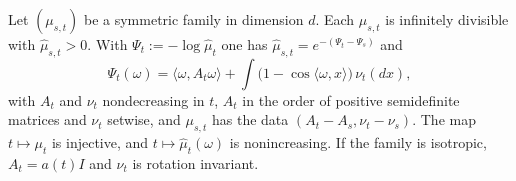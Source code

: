 \begin{lemma}[structure]
\label{lem:family-structure}

Let $(\mu_{s,t})$ be a symmetric family in dimension $d$. Each $\mu_{s,t}$ is infinitely divisible
with $\widehat\mu_{s,t} > 0$. With $\Psi_t := -\log\widehat\mu_t$ one has
$\widehat\mu_{s,t} = e^{-(\Psi_t - \Psi_s)}$ and
\[
  \Psi_t(\omega) = \langle\omega, A_t\omega\rangle + \int\bigl(1 - \cos\langle\omega, x\rangle\bigr)\,\nu_t(dx),
\]
with $A_t$ and $\nu_t$ nondecreasing in $t$, $A_t$ in the order of positive semidefinite matrices
and $\nu_t$ setwise, and $\mu_{s,t}$ has the data $(A_t - A_s, \nu_t - \nu_s)$.
The map $t \mapsto \mu_t$ is injective, and $t \mapsto \widehat\mu_t(\omega)$ is nonincreasing. If
the family is isotropic, $A_t = a(t)I$ and $\nu_t$ is rotation invariant.
\end{lemma}

